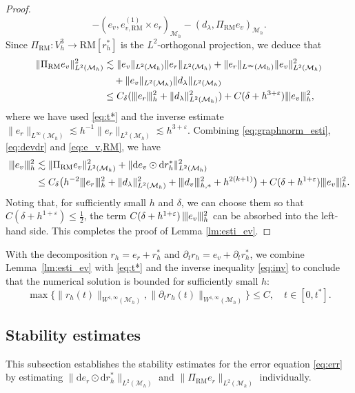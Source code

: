 \documentclass[11pt,a4paper,oneside,reqno]{amsart}
\theoremstyle{definition}
\theoremstyle{plain}
\numberwithin{theorem}{section}
\numberwithin{proposition}{section}
\numberwithin{lemma}{section}
\numberwithin{equation}{section}
\newcommand{\Man}{\mathcal{M}}
\newcommand{\RM}{\mathrm{RM}}
\newcommand{\normt}[1]{%
	\vert\kern-0.9pt\vert\kern-0.9pt\vert #1
	\vert\kern-0.9pt\vert\kern-0.9pt\vert}
\begin{document}
\begin{proof}
\[    - (e_v, e_{v, \RM}^{(1)} \times e_r) _{\Man_h}
    - (d_{\lambda}, \Pi_{\RM} e_v)_{\Man_h}. 
\]
Since $\Pi_{\RM}: V_h^3 \to \RM[r_h^*]$ is the $L^2$-orthogonal projection, we deduce that
\begin{equation}\label{eq:e_v,RM}
\begin{aligned}
        \|\Pi_{\RM} e_v \|_{L^2(\Man_h)}^2 & \lesssim 
        \| e_v \|_{L^2(\Man_h)} \| e_r \|_{L^2(\Man_h)} + 
        \| e_r \|_{L^\infty(\Man_h)} \| e_v \|_{L^2(\Man_h)}^2\\
        & \quad + \| e_v \|_{L^2(\Man_h)} \| d_{\lambda} \|_{L^2(\Man_h)} \\ 
        & \leq C_{\delta} (\normt{e_r}_h^2 + \| d_{\lambda} \|_{L^2(\Man_h)}^2) + C(\delta + h^{3+ \varepsilon}) \normt{e_v}_h^2,
\end{aligned}
\end{equation}
where we have used  \eqref{eq:t*} and  the inverse estimate  $ \| e_r \|_{L^\infty(\Man_h)} \lesssim h^{-1} \| e_r \|_{L^2(\Man_h)} \lesssim h^{3 + \varepsilon} $.
Combining \eqref{eq:graphnorm_esti},  \eqref{eq:devdr} and \eqref{eq:e_v,RM}, we have 
\[ \begin{aligned}
    \normt{e_v}^2_h &\lesssim 
    \|\Pi_{\RM} e_v\|_{L^2(\Man_h)}^2 +  \|\mathrm{d} e_{v} \odot \mathrm{d} r_h^{*}\|_{L^2(\Man_h)}^2 \\ 
    & \leq C_{\delta}\big( h^{-2}\normt{e_r}_h^2  + \| d_{\lambda} \|_{L^2(\Man_h)}^2 + \normt{d_v}_{h,*}^2 + h^{2(k+1)} \big)
 + C(\delta + h^{1+\varepsilon}) \normt{e_v}_h^2. 
\end{aligned} \]
Noting that, for sufficiently small $h$ and $\delta$, we can choose them so that
$C(\delta + h^{1+\varepsilon}) \leq \tfrac12$, the term
$C(\delta + h^{1+\varepsilon})\,\normt{e_v}_h^2$ can be absorbed into the left-hand side.
This completes the proof of Lemma \ref{lm:esti_ev}.
\end{proof}

With the decomposition \( r_h = e_r + r_h^* \) and \( \partial_t r_h = e_v + \partial_t r_h^* \), we combine Lemma~\ref{lm:esti_ev} with \eqref{eq:t*} and the inverse inequality \eqref{eq:inv} to conclude that the numerical solution is bounded for sufficiently small \(h\):
\begin{equation}\label{eq:boundedness}
\max\big\{ \|r_h(t)\|_{W^{1,\infty}(\Man_h)}, \|\partial_t r_h(t)\|_{W^{1,\infty}(\Man_h)}\big\} \leq C, 
\quad t \in [0, t^*].
\end{equation}


\subsection{Stability estimates}
This subsection establishes the stability estimates for the error equation \eqref{eq:err} by 
estimating $\|\mathrm{d} e_{r} \odot \mathrm{d} r_h^*\|_{L^2(\Man_h)}$ and  $\|\Pi_{\RM} e_r\|_{L^2(\Man_h)}$ individually.
\end{document}
